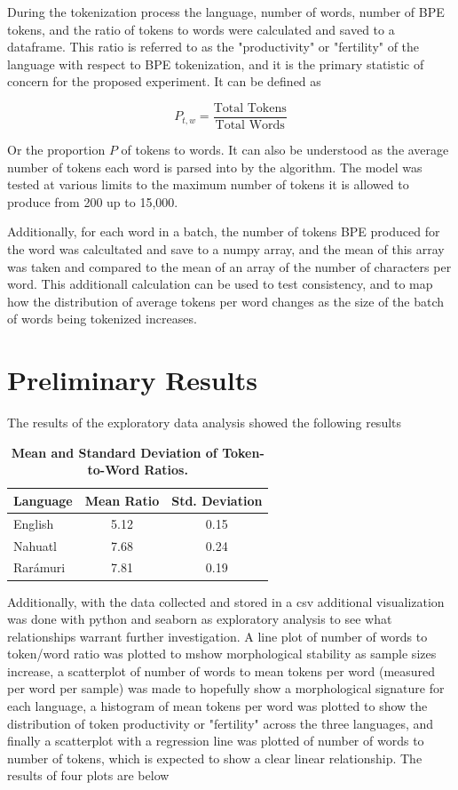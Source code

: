 \documentclass[11pt]{article}
\begin{document}
During the tokenization process the language, number of words, number of BPE tokens, and the ratio of tokens to words were calculated and saved to a dataframe. This ratio is referred to as the "productivity" or "fertility" of the language with respect to BPE tokenization, and it is the primary statistic of concern for the proposed experiment. It can be defined as 

\[
    P_{t, w} = \frac{\text{Total Tokens}}{\text{Total Words}} 
\]

Or the proportion $P$ of tokens to words. It can also be understood as the average number of tokens each word is parsed into by the algorithm. The model was tested at various limits to the maximum number of tokens it is allowed to produce from 200 up to 15,000. 

Additionally, for each word in a batch, the number of tokens BPE produced for the word was calcultated and save to a numpy array, and the mean of this array was taken and compared to the mean of an array of the number of characters per word. This additionall calculation can be used to test consistency, and to map how the distribution of average tokens per word changes as the size of the batch of words being tokenized increases. 

\newpage
\section{Preliminary Results}

The results of the exploratory data analysis showed the following results 
\begin{table}[htbp]
    \centering
    \caption{\textbf{Mean and Standard Deviation of Token-to-Word Ratios.}}
    \label{tab:Tokens to Words}
    \begin{tabular}{l c c}
        \toprule
        \textbf{Language} & \textbf{Mean Ratio} & \textbf{Std. Deviation} \\
        \midrule
        English  & 5.12  & 0.15 \\
        Nahuatl  & 7.68  & 0.24 \\
        Rarámuri & 7.81  & 0.19 \\
        \bottomrule
    \end{tabular}
\end{table}

Additionally, with the data collected and stored in a csv additional visualization was done with python and seaborn as exploratory analysis to see what relationships warrant further investigation. A line plot of number of words to token/word ratio was plotted to mshow morphological stability as sample sizes increase, a scatterplot of number of words to mean tokens per word (measured per word per sample) was made to hopefully show a morphological signature for each language, a histogram of mean tokens per word was plotted to show the distribution of token productivity or "fertility" across the three languages, and finally a scatterplot with a regression line was plotted of number of words to number of tokens, which is expected to show a clear linear relationship. 
The results of four plots are below
\end{document}
